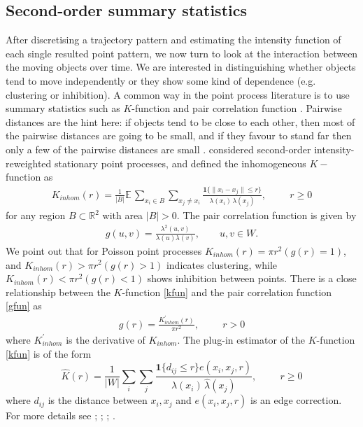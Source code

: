 \documentclass[article]{jss}
\newcommand{\R}{\mathbb{R}}
\newcommand{\ee}{\mathbb{E}}
\begin{document}
\subsection{Second-order summary statistics}
  After discretising a trajectory pattern and estimating the intensity function of each single resulted point pattern, we now turn to look at the interaction between the moving objects over time. We are interested in distinguishing whether objects tend to move independently or they show some kind of dependence (e.g. clustering or inhibition). A common way in the point process literature is to use summary statistics such as $K$-function and pair correlation function \citep{ripley77,baddeley00}. Pairwise distances are the hint here: if objects tend to be close to each other, then most of the pairwise distances are going to be small, and if they favour to stand far then only a few of the pairwise distances are small \citep{BRT15}.  \cite{baddeley00} considered second-order intensity-reweighted stationary point processes, and defined the inhomogeneous $K-$function as
  \begin{eqnarray}\label{kfun}
  K_{inhom}(r) =
  \frac{1}{|B|} \ee \,
  \sum_{x_i \in B} \sum_{x_j \neq x_i} 
  \frac{\textbf{1} \{ \|x_i - x_j\| \le r \} }{ \lambda(x_i) \, \lambda(x_j)}, \hspace{1cm} r \geq 0
  \end{eqnarray}
  for any region $B \subset \R^2$ with area $|B| > 0$. The pair correlation function is given by
  \begin{eqnarray}\label{gfun}
  g(u,v)=\frac{\lambda^2(u,v)}{\lambda(u) \lambda(v)}, \qquad u,v \in W.
  \end{eqnarray}
  We point out that for Poisson point processes $K_{inhom}(r)=\pi r^2 (g(r)=1)$, and $K_{inhom}(r)>\pi r^2 (g(r)>1)$ indicates clustering, while $K_{inhom}(r)<\pi r^2 (g(r)<1)$ shows inhibition between points. There is a close relationship between the $K$-function \eqref{kfun} and the pair correlation function \eqref{gfun} as 
  \begin{eqnarray*}
  g(r)=\frac{K^{'}_{inhom}(r)}{\pi r^2}, \hspace{1cm} r>0
\end{eqnarray*}
where $K^{'}_{inhom}$ is the derivative of $K_{inhom}$.
  The plug-in estimator of the $K$-function \eqref{kfun} is of the form
  \begin{equation}\label{e:hatKinhom:plugin}
  \widehat{K}(r) =
  \frac{1}{|W|}\sum_i \sum_j 
  \frac{\textbf{1}\{d_{ij} \le r\} e(x_i,x_j,r)}{\widehat\lambda(x_i) \, \widehat\lambda(x_j)}, \hspace{1cm} r \geq 0
  \end{equation}
  where $d_{ij}$ is the distance between $x_i,x_j$ and $e(x_i,x_j,r)$ is an edge correction. For more details see \cite[Chapter 4]{MW03}; \cite{IPSS08,D13}; \cite{gabriel2014}; \citep[Chapter7]{BRT15}.
\end{document}
